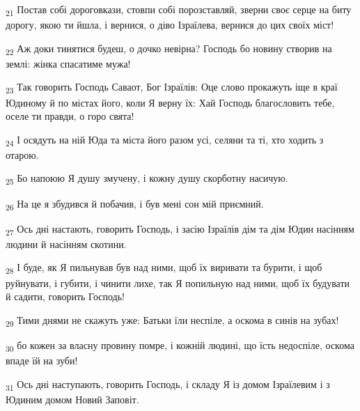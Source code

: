 \begin{tcolorbox}
\textsubscript{21} Постав собі дороговкази, стовпи собі порозставляй, зверни своє серце на биту дорогу, якою ти йшла, і вернися, о діво Ізраїлева, вернися до цих своїх міст!
\end{tcolorbox}
\begin{tcolorbox}
\textsubscript{22} Аж доки тинятися будеш, о дочко невірна? Господь бо новину створив на землі: жінка спасатиме мужа!
\end{tcolorbox}
\begin{tcolorbox}
\textsubscript{23} Так говорить Господь Саваот, Бог Ізраїлів: Оце слово прокажуть іще в краї Юдиному й по містах його, коли Я верну їх: Хай Господь благословить тебе, оселе ти правди, о горо свята!
\end{tcolorbox}
\begin{tcolorbox}
\textsubscript{24} І осядуть на ній Юда та міста його разом усі, селяни та ті, хто ходить з отарою.
\end{tcolorbox}
\begin{tcolorbox}
\textsubscript{25} Бо напоюю Я душу змучену, і кожну душу скорботну насичую.
\end{tcolorbox}
\begin{tcolorbox}
\textsubscript{26} На це я збудився й побачив, і був мені сон мій приємний.
\end{tcolorbox}
\begin{tcolorbox}
\textsubscript{27} Ось дні настають, говорить Господь, і засію Ізраїлів дім та дім Юдин насінням людини й насінням скотини.
\end{tcolorbox}
\begin{tcolorbox}
\textsubscript{28} І буде, як Я пильнував був над ними, щоб їх виривати та бурити, і щоб руйнувати, і губити, і чинити лихе, так Я попильную над ними, щоб їх будувати й садити, говорить Господь!
\end{tcolorbox}
\begin{tcolorbox}
\textsubscript{29} Тими днями не скажуть уже: Батьки їли неспіле, а оскома в синів на зубах!
\end{tcolorbox}
\begin{tcolorbox}
\textsubscript{30} бо кожен за власну провину помре, і кожній людині, що їсть недоспіле, оскома впаде їй на зуби!
\end{tcolorbox}
\begin{tcolorbox}
\textsubscript{31} Ось дні наступають, говорить Господь, і складу Я із домом Ізраїлевим і з Юдиним домом Новий Заповіт.
\end{tcolorbox}
